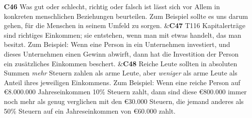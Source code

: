 \documentclass[
		11pt,
		a4paper,
		openright,
		oneside,
		ngerman
	]
	{book}
\begin{document}
\begin{longtabu}[htpb]
\midrule

\textbf{C46}
		Was gut oder schlecht, richtig oder falsch ist lässt sich vor Allem in konkreten menschlichen Beziehungen beurteilen.
		Zum Beispiel sollte es uns darum gehen, für die Menschen in seinem Umfeld zu sorgen.
&\textbf{C47} T116
		Kapitalerträge sind richtiges Einkommen; sie entstehen, wenn man mit etwas handelt, das man besitzt.
		Zum Beispiel: Wenn eine Person in ein Unternehmen investiert, und dieses Unternehmen einen Gewinn abwirft, dann hat die Investition der Person ein zusätzliches Einkommen beschert.
&\textbf{C48} %
		Reiche Leute sollten in absoluten Summen \emph{mehr} Steuern zahlen als arme Leute, aber \emph{weniger} als arme Leute als Anteil ihres jeweiligen Einkommens.
		Zum Beispiel: Wenn eine reiche Person auf \euro 8.000.000 Jahreseinkommen 10\% Steuern zahlt, dann sind diese \euro 800.000 immer noch mehr als genug verglichen mit den \euro 30.000 Steuern, die jemand anderes als 50\% Steuern auf ein Jahreseinkommen von \euro 60.000 zahlt.
\\

\midrule


\end{longtabu}
\end{document}
